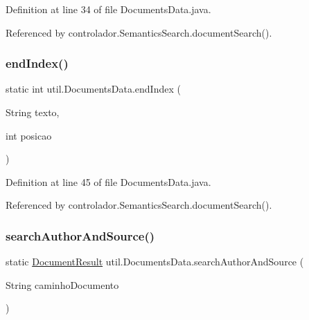 Definition at line 34 of file Documents\+Data.\+java.



Referenced by controlador.\+Semantics\+Search.\+document\+Search().

\hypertarget{classutil_1_1DocumentsData_ad153c5f3425b5dd0599df8a15df620ff}{}\label{classutil_1_1DocumentsData_ad153c5f3425b5dd0599df8a15df620ff} 
\subsubsection{\texorpdfstring{end\+Index()}{endIndex()}}
{\footnotesize\ttfamily static int util.\+Documents\+Data.\+end\+Index (\begin{DoxyParamCaption}\item[{String}]{texto,  }\item[{int}]{posicao }\end{DoxyParamCaption})\hspace{0.3cm}{\ttfamily [static]}}



Definition at line 45 of file Documents\+Data.\+java.



Referenced by controlador.\+Semantics\+Search.\+document\+Search().

\hypertarget{classutil_1_1DocumentsData_a8a08f5b6aab10fb5628aed6771e3938a}{}\label{classutil_1_1DocumentsData_a8a08f5b6aab10fb5628aed6771e3938a} 
\subsubsection{\texorpdfstring{search\+Author\+And\+Source()}{searchAuthorAndSource()}}
{\footnotesize\ttfamily static \hyperlink{classentidade_1_1resultados_1_1DocumentResult}{Document\+Result} util.\+Documents\+Data.\+search\+Author\+And\+Source (\begin{DoxyParamCaption}\item[{String}]{caminho\+Documento }\end{DoxyParamCaption})\hspace{0.3cm}{\ttfamily [static]}}



